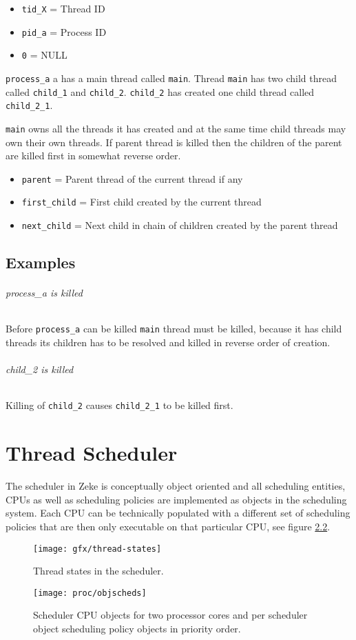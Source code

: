 \begin{itemize}
  \item \verb+tid_X+ = Thread ID
  \item \verb+pid_a+ = Process ID
  \item \verb+0+ = NULL
\end{itemize}

\verb+process_a+ a has a main thread called \verb+main+. Thread
\verb+main+ has two child thread called \verb+child_1+ and \verb+child_2+.
\verb+child_2+ has created one child thread called \verb+child_2_1+.

\verb+main+ owns all the threads it has created and at the same time child
threads may own their own threads. If parent thread is killed then the
children of the parent are killed first in somewhat reverse order.

\begin{itemize}
  \item \verb+parent+ = Parent thread of the current thread if any
  \item \verb+first_child+ = First child created by the current thread
  \item \verb+next_child+ = Next child in chain of children created by the
        parent thread
\end{itemize}

\section{Examples}

\subparagraph*{process\_a is killed}

Before \verb+process_a+ can be killed \verb+main+ thread must be killed,
because it has child threads its children has to be resolved and killed in
reverse order of creation.

\subparagraph*{child\_2 is killed}

Killing of \verb+child_2+ causes \verb+child_2_1+ to be killed first.


\chapter{Thread Scheduler}

The scheduler in Zeke is conceptually object oriented and all
scheduling entities, CPUs as well as scheduling policies are
implemented as objects in the scheduling system. Each CPU can
be technically populated with a different set of scheduling
policies that are then only executable on that particular
CPU, see figure \ref{figure:objscheds}.

\begin{figure}
  \center
  \texttt{[image: gfx/thread-states]}
  \caption{Thread states in the scheduler.}
  \label{figure:threadstates}
\end{figure}

\begin{figure}
  \center
  \texttt{[image: proc/objscheds]}
  \caption{Scheduler CPU objects for two processor cores and
           per scheduler object scheduling policy objects in
           priority order.}
  \label{figure:objscheds}
\end{figure}
